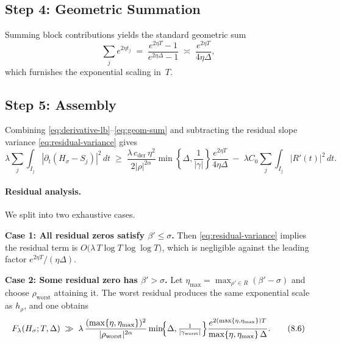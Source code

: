 \subsection{Step 4: Geometric Summation}\label{step:geom-sum}

Summing block contributions yields the standard geometric sum
\begin{equation}
\sum_j e^{2\eta t_j}
  \;=\; \frac{e^{2\eta T}-1}{e^{2\eta\Delta}-1}
  \;\asymp\; \frac{e^{2\eta T}}{4\eta\Delta},
\tag{8.4}\label{eq:geom-sum}
\end{equation}
which furnishes the exponential scaling in~$T$.

\subsection{Step 5: Assembly}\label{step:assembly}

Combining \eqref{eq:derivative-lb}–\eqref{eq:geom-sum} and subtracting the residual slope
variance \eqref{eq:residual-variance} gives
\begin{equation}
\lambda\sum_j\!\int_{I_j}\!|\partial_t(H_\sigma-S_j)|^2\,dt
 \;\ge\;
\frac{\lambda\, c_{\mathrm{der}}\,\eta^2}{2|\rho|^{2\alpha}}
 \min\!\left\{\!\Delta,\frac{1}{|\gamma|}\!\right\}
 \frac{e^{2\eta T}}{4\eta\Delta}
 \;-\; \lambda C_0\!\sum_j\!\int_{I_j}\!|R'(t)|^2\,dt.
\tag{8.5}\label{eq:assembly}
\end{equation}

\paragraph{Residual analysis.}
We split into two exhaustive cases.

\smallskip
\noindent
\textbf{Case 1: All residual zeros satisfy $\beta'\le\sigma$.}
Then \eqref{eq:residual-variance} implies the residual term is
$O\bigl(\lambda\,T\log T\log\log T\bigr)$, which is negligible against
the leading factor $e^{2\eta T}/(\eta\Delta)$.

\smallskip
\noindent
\textbf{Case 2: Some residual zero has $\beta'>\sigma$.}
Let $\eta_{\max}=\max_{\rho'\in R}(\beta'-\sigma)$ and choose
$\rho_{\mathrm{worst}}$ attaining it.  The worst residual produces the same
exponential scale as $h_\rho$, and one obtains
\begin{equation}
F_\lambda(H_\sigma;T,\Delta)
 \;\gg\;
 \lambda\,
 \frac{(\max\{\eta,\eta_{\max}\})^2}{|\rho_{\mathrm{worst}}|^{2\alpha}}
 \min\!\Bigl\{\Delta,\tfrac{1}{|\gamma_{\mathrm{worst}}|}\Bigr\}
 \frac{e^{2(\max\{\eta,\eta_{\max}\})T}}{\max\{\eta,\eta_{\max}\}\,\Delta}.
\tag{8.6}\label{eq:worst}
\end{equation}

